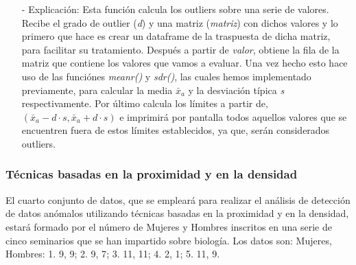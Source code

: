 \documentclass[a4paper, 12pt]{article}
\begin{document}
{\begin{itemize}
\begin{itemize}
                    \item[-] Explicación: Esta función calcula los outliers sobre una serie de valores. Recibe el grado de outlier (\emph{d}) y una matriz (\emph{matriz}) con dichos valores y lo primero que hace es crear un dataframe de la traspuesta de dicha matriz, para facilitar su tratamiento. Después a partir de \emph{valor}, obtiene la fila de la matriz que contiene los valores que vamos a evaluar. Una vez hecho esto hace uso de las funciónes \emph{meanr()} y \emph{sdr()}, las cuales hemos implementado previamente, para calcular la media \emph{$\bar{x}$$_{a}$} y la desviación típica \emph{s} respectivamente. Por último calcula los límites a partir de, \emph{$(\bar{x}_{a} - d \cdot s, \bar{x}_{a} + d \cdot s)$} e imprimirá por pantalla todos aquellos valores que se encuentren fuera de estos límites establecidos, ya que, serán considerados outliers.
                \end{itemize}
            \end{itemize}
            
            \subsubsection{Técnicas basadas en la proximidad y en la densidad}
            El cuarto conjunto de datos, que se empleará para realizar el análisis de detección de datos anómalos utilizando técnicas basadas en la proximidad y en la densidad, estará formado por el número de Mujeres y Hombres inscritos en una serie de cinco seminarios que se han impartido sobre biología. Los datos son: {Mujeres, Hombres}: 1. {9, 9}; 2. {9, 7}; 3. {11, 11}; 4. {2, 1}; 5. {11, 9}.

}
\end{document}
